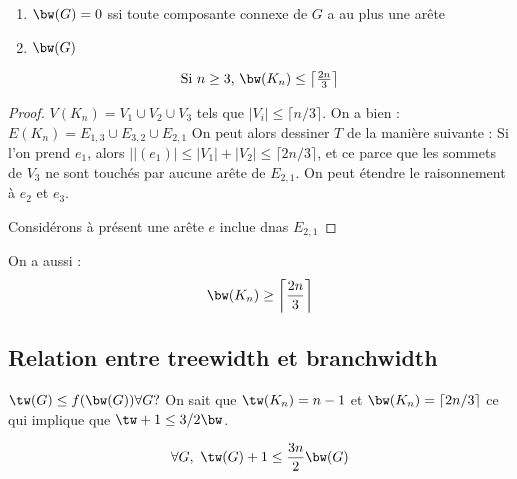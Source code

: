 \documentclass[a4paper, 11pt]{thesis}
\begin{document}
\begin{prop}
    \begin{enumerate}
        \item $\bw(G) = 0$ ssi toute composante connexe de $G$ a au plus une arête
        \item $\bw(G)$ %
    \end{enumerate}
\end{prop}

\begin{prop}
    \begin{displaymath}
        \mbox{Si }n \geq 3$, $\bw(K_n) \leq \left \lceil \frac{2n}{3} \right \rceil
    \end{displaymath}
\end{prop}

\begin{proof}
    $V(K_n) = V_1 \cup V_2 \cup V_3$ tels que $|V_i| \leq \lceil n/3 \rceil$.
    On a bien : $E(K_n) = E_{1,3} \cup E_{3,2} \cup E_{2,1}$
    On peut alors dessiner $T$ de la manière suivante :
    Si l'on prend $e_1$, alors $|\mid(e_1)| \leq |V_1| + |V_2| \leq \lceil 2n/3 \rceil$, et ce parce
    que les sommets de $V_3$ ne sont touchés par aucune arête de $E_{2,1}$. On peut étendre le
    raisonnement à $e_2$ et $e_3$. 

    Considérons à présent une arête $e$ inclue dnas $E_{2,1}$
\end{proof}

\begin{prop}
    On a aussi :
    \begin{displaymath}
        \bw(K_n) \geq \left \lceil \frac{2n}{3} \right \rceil
    \end{displaymath}
\end{prop}

\subsection{Relation entre treewidth et branchwidth}

$\tw(G) \leq f(\bw(G)) \forall G ?$
On sait que $\tw(K_n) = n - 1$ et $\bw(K_n) = \lceil 2n/3 \rceil$ ce qui implique que $\tw + 1 \leq
3/2 \bw$.

\begin{prop}
    \begin{displaymath}
        \forall G,\ \tw(G) + 1 \leq \frac{3n}{2} \bw(G)
    \end{displaymath}
\end{prop}
\end{document}
